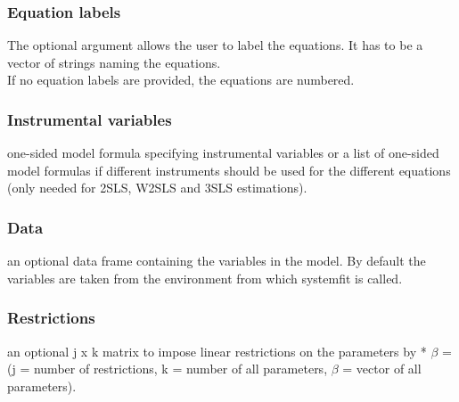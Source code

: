 \documentclass[article]{jss}
\begin{document}
\subsubsection{Equation labels}
The optional argument  allows the user to label the equations.
It has to be a vector of strings naming the equations.\\
If no equation labels are provided, the equations are numbered.
 
\subsubsection{Instrumental variables}   
one-sided model formula specifying instrumental variables
   or a list of one-sided model formulas if different instruments should
   be used for the different equations (only needed for 2SLS, W2SLS and
   3SLS estimations).

\subsubsection{Data}   
 an optional data frame containing the variables in the model.
   By default the variables are taken from the environment from which
   systemfit is called.

\subsubsection{Restrictions}   
 an optional j x k matrix to impose linear
   restrictions on the parameters by  * $\beta$ = 
   (j = number of restrictions, k = number of all parameters,
   $\beta$ = vector of all parameters).
\end{document}
